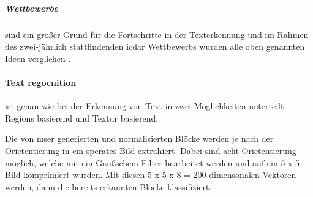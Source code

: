 \subparagraph{Wettbewerbe}\label{ICDAR} sind ein großer Grund für die Fortschritte in der Texterkennung und im Rahmen des zwei-jährlich stattfindenden \Gls{icdar} Wettbewerbs wurden alle oben genannten Ideen verglichen \cite{ICDAR:online}.

\paragraph{Text regocnition} ist genau wie bei der Erkennung von Text in zwei Möglichkeiten unterteilt: Regions basierend und Textur basierend. 

Die von \gls{mser} generierten und normalisierten Blöcke werden je nach der Orietentierung in ein sperates Bild extrahiert. Dabei sind acht Orietentierung möglich, welche mit ein Gaußschem Filter bearbeitet werden und auf ein 5 x 5 Bild komprimiert wurden. Mit diesen 5 x 5 x 8 = 200 dimensonalen Vektoren werden, dann die bereits erkannten Blöcke klassifiziert. 


